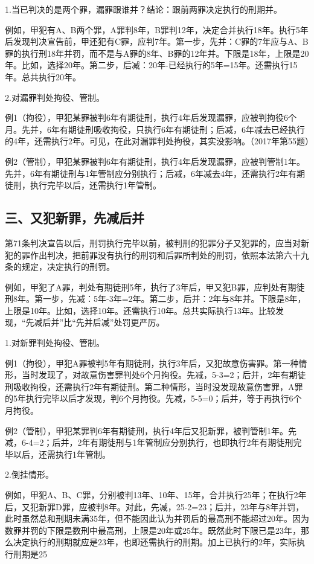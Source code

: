 1.当已判决的是两个罪，漏罪跟谁并？结论：跟前两罪决定执行的刑期并。

例如，甲犯有A、B两个罪，A罪判8年，B罪判12年，决定合并执行18年。执行5年后发现判决宣告前，甲还犯有C罪，应判7年。第一步，先并：C罪的7年应与A、B罪的执行刑18年并罚，而不是与A罪的8年、B罪的12年并。下限是18年，上限是20年。比如，选择20年。第二步，后减：20年-已经执行的5年=15年。还需执行15年。总共执行20年。

2.对漏罪判处拘役、管制。

例1（拘役），甲犯某罪被判6年有期徒刑，执行4年后发现漏罪，应被判拘役6个月。先并，6年有期徒刑吸收拘役，只执行6年有期徒刑；后减，6年减去已经执行的4年，还需执行2年。可见，在此对漏罪判处拘役，其实没影响。（2017年第55题）

例2（管制），甲犯某罪被判6年有期徒刑，执行4年后发现漏罪，应被判管制1年。先并，6年有期徒刑与1年管制应分别执行；后减，6年减去4年，还需执行2年有期徒刑，执行完毕以后，还需执行1年管制。

\subsection*{三、又犯新罪，先减后并}

第71条判决宣告以后，刑罚执行完毕以前，被判刑的犯罪分子又犯罪的，应当对新犯的罪作出判决，把前罪没有执行的刑罚和后罪所判处的刑罚，依照本法第六十九条的规定，决定执行的刑罚。

例如，甲犯了A罪，判处有期徒刑5年，执行了3年后，甲又犯B罪，应判处有期徒刑8年。第一步，先减：5年-3年=2年。第二步，后并：2年与8年并。下限是8年，上限是10年。比如，选择10年。还需执行10年。总共实际执行13年。比较发现，“先减后并”比“先并后减”处罚更严厉。

1.对新罪判处拘役、管制。

例1（拘役），甲犯A罪被判5年有期徒刑，执行3年后，又犯故意伤害罪。第一种情形，当时发现了，对故意伤害罪判处6个月拘役。先减，5-3=2；后并，2年有期徒刑吸收拘役，还需执行2年有期徒刑。第二种情形，当时没发现故意伤害罪，A罪的5年执行完毕以后才发现，判6个月拘役。先减，5-5=0；后并，等于再执行6个月拘役。

例2（管制），甲犯某罪判6年有期徒刑，执行4年后又犯新罪，被判管制1年。先减，6-4=2；后并，2年有期徒刑与1年管制应分别执行，也即执行2年有期徒刑完毕以后，还需执行1年管制。

2.倒挂情形。

例如，甲犯A、B、C罪，分别被判13年、10年、15年，合并执行25年；在执行2年后，又犯新罪D罪，应被判8年。对此，先减，25-2=23；后并，23年与8年并罚，此时虽然总和刑期未满35年，但不能因此认为并罚后的最高刑不能超过20年。因为数罪并罚的下限是数刑中最高刑，上限是20年或25年。既然此时下限已是23年，那么决定执行的刑期就应是23年，也即还需执行的刑期。加上已执行的2年，实际执行刑期是25

